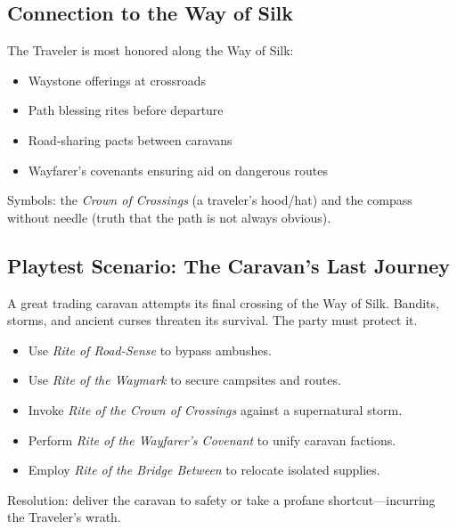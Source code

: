 \subsection*{Connection to the Way of Silk}
The Traveler is most honored along the Way of Silk:
\begin{itemize}
\item Waystone offerings at crossroads  
\item Path blessing rites before departure  
\item Road-sharing pacts between caravans  
\item Wayfarer's covenants ensuring aid on dangerous routes  
\end{itemize}
Symbols: the \emph{Crown of Crossings} (a traveler's hood/hat) and the compass without needle (truth that the path is not always obvious).

\subsection*{Playtest Scenario: The Caravan's Last Journey}
A great trading caravan attempts its final crossing of the Way of Silk. Bandits, storms, and ancient curses threaten its survival. The party must protect it.  

\begin{itemize}
\item Use \emph{Rite of Road-Sense} to bypass ambushes.  
\item Use \emph{Rite of the Waymark} to secure campsites and routes.  
\item Invoke \emph{Rite of the Crown of Crossings} against a supernatural storm.  
\item Perform \emph{Rite of the Wayfarer's Covenant} to unify caravan factions.  
\item Employ \emph{Rite of the Bridge Between} to relocate isolated supplies.  
\end{itemize}

Resolution: deliver the caravan to safety or take a profane shortcut---incurring the Traveler’s wrath.
